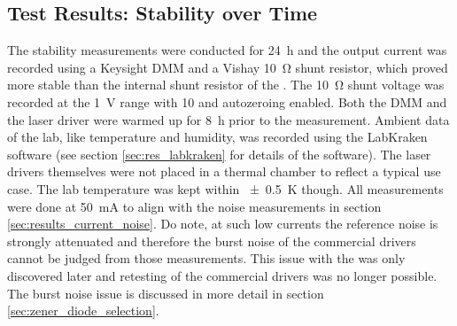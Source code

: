 \subsection{Test Results: Stability over Time}%
\label{sec:results_stability}
The stability measurements were conducted for \qty{24}{\hour} and the output current was recorded using a Keysight  DMM and a Vishay  \qty{10}{\ohm} shunt resistor, which proved more stable than the internal shunt resistor of the . The \qty{10}{\ohm} shunt voltage was recorded at the \qty{1}{\V} range with \qty{10}{\plc} and autozeroing enabled. Both the DMM and the laser driver were warmed up for \qty{8}{\hour} prior to the measurement. Ambient data of the lab, like temperature and humidity, was recorded using the LabKraken software (see section \ref{sec:res_labkraken} for details of the software). The laser drivers themselves were not placed in a thermal chamber to reflect a typical use case. The lab temperature was kept within \qty{\pm 0.5}{\K} though. All measurements were done at \qty{50}{\mA} to align with the noise measurements in section \ref{sec:results_current_noise}. Do note, at such low currents the reference noise is strongly attenuated and therefore the burst noise of the commercial drivers cannot be judged from those measurements. This issue with the  was only discovered later and retesting of the commercial drivers was no longer possible. The burst noise issue is discussed in more detail in section \ref{sec:zener_diode_selection}.


